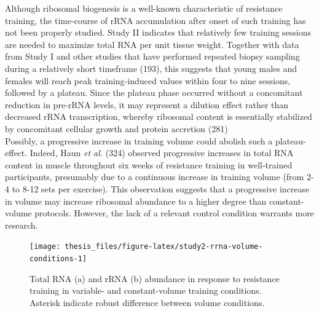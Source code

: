 \documentclass[twoside,10pt]{gihclass} %
\begin{document}
Although ribosomal biogenesis is a well-known characteristic of resistance training, the time-course of rRNA accumulation after onset of such training has not been properly studied.
Study II indicates that relatively few training sessions are needed to maximize total RNA per unit tissue weight.
Together with data from Study I and other studies that have performed repeated biopsy sampling during a relatively short timeframe (193), this suggests that young males and females will reach peak training-induced values within four to nine sessions, followed by a plateau.
Since the plateau phase occurred without a concomitant reduction in pre-rRNA levels, it may represent a dilution effect rather than decreased rRNA transcription, whereby ribosomal content is essentially stabilized by concomitant cellular growth and protein accretion
(281)\\
Possibly, a progressive increase in training volume could abolish such a plateau-effect.
Indeed, Haun \emph{et al.}
(324)
observed progressive increases in total RNA content in muscle throughout six weeks of resistance training in well-trained participants, presumably due to a continuous increase in training volume (from 2-4 to 8-12 sets per exercise). This observation suggests that a progressive increase in volume may increase ribosomal abundance to a higher degree than constant-volume protocols.
However, the lack of a relevant control condition warrants more research.
\begin{figure}

{\centering \texttt{[image: thesis\_files/figure-latex/study2-rrna-volume-conditions-1]} 

}

\caption[Total RNA and rRNA abundance in response to training in Study II.]{Total RNA (a) and rRNA (b) abundance in response to resistance training in variable- and constant-volume training conditions. Asterisk indicate robust difference between volume conditions.}\label{fig:study2-rrna-volume-conditions}
\end{figure}
\end{document}
